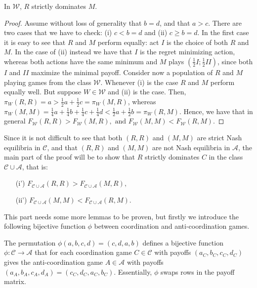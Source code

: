 \documentclass[fleqn,reqno,11pt]{article}
\begin{document}
\begin{lemma} \label{lemma:W games} In $\mathcal{W}$, $R$ strictly dominates $M$.
\end{lemma}

\begin{proof}
  Assume without loss of generality that $b=d$, and that $ a>c $. There are two cases that we have to check:
  (i) $c < b=d$ and (ii) $c \geq b=d$. In the first case it is easy to see that $R$ and $M$
  perform equally: act $I$ is the choice of both $R$ and $M$. In the case of (ii) instead we have that $I$ is the regret minimizing action, whereas both actions have the same minimum and $M$ plays $(\frac{1}{2}I;\frac{1}{2}II)$, since both $I$ and
  $II$ maximize the minimal payoff. Consider now a population of $R$ and $M$ playing games from
  the class $\mathcal{W}$.  Whenever (i) is the case $R$ and $M$ perform equally well. But suppose $W \in \mathcal{W}$ and (ii) is the case. Then,
  $\pi_W(R,R)=a>\frac{1}{2}a+\frac{1}{2}c=\pi_W(M,R)$, whereas
  $\pi_W(M,M)=\frac{1}{4}a+\frac{1}{4}b+\frac{1}{4}c+\frac{1}{4}d<\frac{1}{2}a+\frac{1}{2}b=\pi_W(R,M)$.
  Hence, we have that in general
  $F_{\mathcal{W}}(R,R)>F_{\mathcal{W}}(M,R),\mbox{ and
  }F_{\mathcal{W}}(M,M)<F_{\mathcal{W}}(R,M)$.
\end{proof}

\noindent Since it is not difficult to see that both $(R,R)$ and $(M,M)$ are strict Nash equilibria in
$\mathcal{C}$, and that $(R,R)$ and $(M,M)$ are not Nash equilibria in $\mathcal{A}$, the main
part of the proof will be to show that $R$ strictly dominates $C$ in the class
$\mathcal{C}\cup\mathcal{A}$, that is:
\begin{multicols}{2}
  \begin{itemize}
  \item[(i')] $F_{\mathcal{C}\cup\mathcal{A}}(R,R)>F_{\mathcal{C}\cup\mathcal{A}}(M,R),$
  \item[(ii')] $F_{\mathcal{C}\cup\mathcal{A}}(M,M)<F_{\mathcal{C}\cup\mathcal{A}}(R,M).$
  \end{itemize}
\end{multicols}

\noindent This part needs some more lemmas to be proven, but firstly we introduce
the following bijective function $\phi$ between coordination and
anti-coordination games.

\begin{definition}[$\phi$] \label{def:bijection phi} The permutation $\phi(a,b,c,d)=(c,d,a,b)$
  defines a bijective function $\phi:\mathcal{C}\rightarrow\mathcal{A}$ that for each
  coordination game $C\in\mathcal{C}$ with payoffs $(a_{C},b_{C},c_{C},d_{C})$ gives the
  anti-coordination game $A\in\mathcal{A}$ with payoffs
  $(a_{A},b_{A},c_{A},d_{A})=(c_{C},d_{C},a_{C},b_{C})$. Essentially, $\phi$ swaps rows
  in the payoff matrix.
\end{definition}
\end{document}
